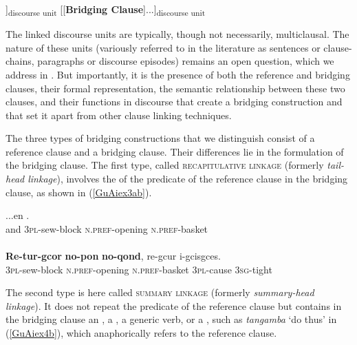 \documentclass[output=paper]{LSP/langsci}
\begin{document}
\begin{exe}
\ex	\label{GuAiex2}
\glt [...[\underline{Reference Clause}]]\textsubscript{discourse unit} [[\textbf{Bridging Clause}]...]\textsubscript{discourse unit}
\end{exe}

The linked discourse units are typically, though not necessarily, multiclausal. The nature of these units (variously referred to in the literature as sentences or clause-chains, paragraphs or discourse episodes) remains an open question, which we address in . But importantly, it is the presence of both the reference and bridging clauses, their formal representation, the semantic relationship between these two clauses, and their functions in discourse that create a bridging construction and that set it apart from other clause linking techniques.

The three types of bridging constructions that we distinguish consist of a reference clause and a bridging clause. Their differences lie in the formulation of the bridging clause. The first type, called \textsc{recapitulative linkage} (formerly \textit{tail-head linkage}), involves the  of the predicate of the reference clause in the bridging clause, as shown in (\ref{GuAiex3ab}). 

\begin{exe}
	\ex	\label{GuAiex3ab}
\begin{xlist}
\ex	\label{GuAiex3a}
\gll		...en   \underline{}     \underline{}     \underline{}.\\
			and   \textsc{3pl}-sew-block   \textsc{n.pref}-opening   \textsc{n.pref}-basket\\
		\glt	{} \\
		\ex	\label{GuAiex3b}
\gll		\textbf{Re-tur-gcor }    \textbf{no-pon}     \textbf{no-qond},   re-gcur   i-gcisgces.\\
\textsc{3pl}-sew-block   \textsc{n.pref}-opening   \textsc{n.pref}-basket   \textsc{3pl}-cause   \textsc{3sg}-tight \\
		\glt	{} 
		\end{xlist}
\end{exe}


The second type is here called \textsc{summary linkage} (formerly \textit{summary-head linkage}). It does not repeat the predicate of the reference clause but contains in the bridging clause an , a , a generic verb, or a , such as \textit{tangamba} `do thus' in (\ref{GuAiex4b}), which anaphorically refers to the reference clause. 
\end{document}
